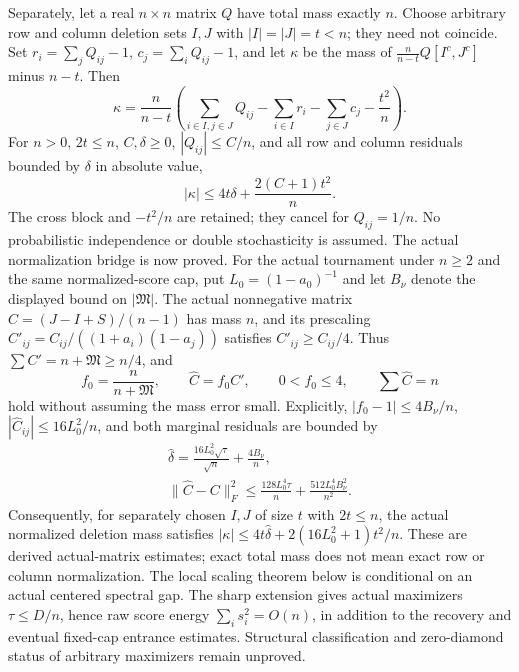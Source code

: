 \documentclass[11pt]{article}
\begin{document}
Separately, let a real $n\times n$ matrix $Q$ have total mass exactly $n$. Choose arbitrary row and column deletion sets $I,J$ with $|I|=|J|=t<n$; they need not coincide. Set $r_i=\sum_jQ_{ij}-1$, $c_j=\sum_iQ_{ij}-1$, and let $\kappa$ be the mass of $\frac n{n-t}Q[I^c,J^c]$ minus $n-t$. Then
\[
 \kappa=\frac n{n-t}\left(\sum_{i\in I,j\in J}Q_{ij}
       -\sum_{i\in I}r_i-\sum_{j\in J}c_j-\frac{t^2}{n}\right).
\]
For $n>0$, $2t\le n$, $C,\delta\ge0$, $|Q_{ij}|\le C/n$, and all row and column residuals bounded by $\delta$ in absolute value,
\[
 |\kappa|\le4t\delta+\frac{2(C+1)t^2}{n}.
\]
The cross block and $-t^2/n$ are retained; they cancel for $Q_{ij}=1/n$. No probabilistic independence or double stochasticity is assumed. The actual normalization bridge is now proved. For the actual tournament under $n\ge2$ and the same normalized-score cap, put $L_0=(1-a_0)^{-1}$ and let $B_\nu$ denote the displayed bound on $|\mathfrak M|$. The actual nonnegative matrix $C=(J-I+S)/(n-1)$ has mass $n$, and its prescaling $C'_{ij}=C_{ij}/((1+a_i)(1-a_j))$ satisfies $C'_{ij}\ge C_{ij}/4$. Thus $\sum C'=n+\mathfrak M\ge n/4$, and
\[
 f_0=\frac n{n+\mathfrak M},\qquad \widehat C=f_0C',\qquad
 0<f_0\le4,\qquad \sum\widehat C=n
\]
hold without assuming the mass error small. Explicitly, $|f_0-1|\le4B_\nu/n$, $|\widehat C_{ij}|\le16L_0^2/n$, and both marginal residuals are bounded by
\[
 \begin{gathered}
 \widehat\delta=\frac{16L_0^2\sqrt\tau}{\sqrt n}+\frac{4B_\nu}{n},\\
 \|\widehat C-C\|_F^2\le
 \frac{128L_0^4\tau}{n}+\frac{512L_0^4B_\nu^2}{n^2}.
 \end{gathered}
\]
Consequently, for separately chosen $I,J$ of size $t$ with $2t\le n$, the actual normalized deletion mass satisfies $|\kappa|\le4t\widehat\delta+2(16L_0^2+1)t^2/n$. These are derived actual-matrix estimates; exact total mass does not mean exact row or column normalization. The local scaling theorem below is conditional on an actual centered spectral gap. The sharp extension gives actual maximizers $\tau\le D/n$, hence raw score energy $\sum_i s_i^2=O(n)$, in addition to the recovery and eventual fixed-cap entrance estimates. Structural classification and zero-diamond status of arbitrary maximizers remain unproved.
\end{document}

